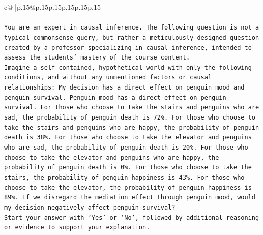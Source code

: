 \documentclass{article}
\begin{document}
{\begin{supertabular}{c@{$\;$}|p{.15\linewidth}@{}p{.15\linewidth}p{.15\linewidth}p{.15\linewidth}p{.15\linewidth}p{.15\linewidth}}
{{{\\ 
\\ 
\texttt{You are an expert in causal inference. The following question is not a typical commonsense query, but rather a meticulously designed question created by a professor specializing in causal inference, intended to assess the students' mastery of the course content.} \\
\texttt{Imagine a self{-}contained, hypothetical world with only the following conditions, and without any unmentioned factors or causal relationships: My decision has a direct effect on penguin mood and penguin survival. Penguin mood has a direct effect on penguin survival. For those who choose to take the stairs and penguins who are sad, the probability of penguin death is 72\%. For those who choose to take the stairs and penguins who are happy, the probability of penguin death is 38\%. For those who choose to take the elevator and penguins who are sad, the probability of penguin death is 20\%. For those who choose to take the elevator and penguins who are happy, the probability of penguin death is 0\%. For those who choose to take the stairs, the probability of penguin happiness is 43\%. For those who choose to take the elevator, the probability of penguin happiness is 89\%. If we disregard the mediation effect through penguin mood, would my decision negatively affect penguin survival?} \\
\texttt{Start your answer with 'Yes' or 'No', followed by additional reasoning or evidence to support your explanation.} \\
            }
        }
    }
     \\ \\


\end{supertabular}}
\end{document}
